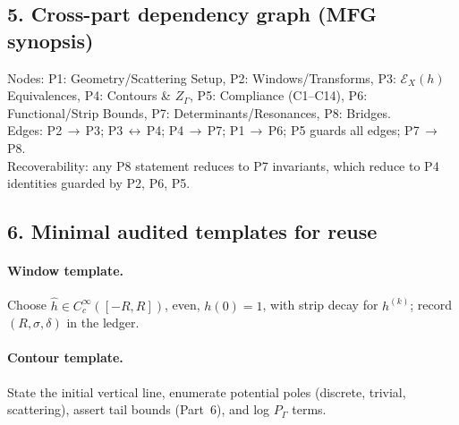\subsection*{5. Cross-part dependency graph (MFG synopsis)}\relax\hspace{0pt}
\label{subsec:tfc8-mfg} %

\noindent
Nodes: \textsf{P1: Geometry/Scattering Setup}, \textsf{P2: Windows/Transforms}, \textsf{P3: $\mathcal{E}_X(h)$ Equivalences}, \textsf{P4: Contours \& $Z_\Gamma$}, \textsf{P5: Compliance (C1--C14)}, \textsf{P6: Functional/Strip Bounds}, \textsf{P7: Determinants/Resonances}, \textsf{P8: Bridges}. \\
Edges: \textsf{P2}\,$\rightarrow$\,\textsf{P3}; \textsf{P3}\,$\leftrightarrow$\,\textsf{P4}; \textsf{P4}\,$\rightarrow$\,\textsf{P7}; \textsf{P1}\,$\rightarrow$\,\textsf{P6}; \textsf{P5} guards all edges; \textsf{P7}\,$\rightarrow$\,\textsf{P8}. \\
Recoverability: any \textsf{P8} statement reduces to \textsf{P7} invariants, which reduce to \textsf{P4} identities guarded by \textsf{P2}, \textsf{P6}, \textsf{P5}. \relax\hspace{0pt}

\subsection*{6. Minimal audited templates for reuse}\relax\hspace{0pt}
\label{subsec:tfc8-templates} %

\paragraph{Window template.}
Choose $\widehat{h}\in C_c^\infty([-R,R])$, even, $h(0)=1$, with strip decay for $h^{(k)}$; record $(R,\sigma,\delta)$ in the ledger. \relax\hspace{0pt}

\paragraph{Contour template.}
State the initial vertical line, enumerate potential poles (discrete, trivial, scattering), assert tail bounds (Part~6), and log $P_\Gamma$ terms. \relax\hspace{0pt}

